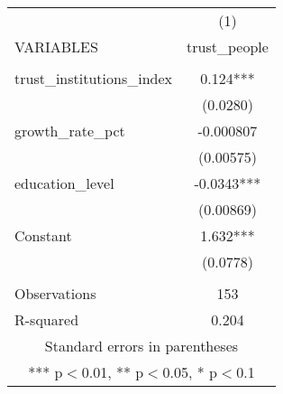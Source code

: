 \documentclass[]{article}
\begin{document}
\begin{tabular}{lc} \hline
 & (1) \\
VARIABLES & trust\_people \\ \hline
 &  \\
trust\_institutions\_index & 0.124*** \\
 & (0.0280) \\
growth\_rate\_pct & -0.000807 \\
 & (0.00575) \\
education\_level & -0.0343*** \\
 & (0.00869) \\
Constant & 1.632*** \\
 & (0.0778) \\
 &  \\
Observations & 153 \\
 R-squared & 0.204 \\ \hline
\multicolumn{2}{c}{ Standard errors in parentheses} \\
\multicolumn{2}{c}{ *** p$<$0.01, ** p$<$0.05, * p$<$0.1} \\
\end{tabular}
\end{document}
